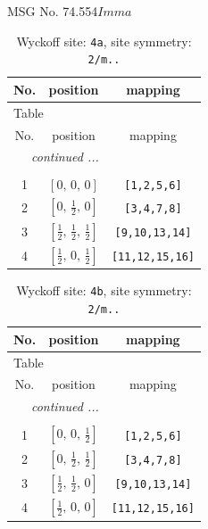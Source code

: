 \documentclass[fleqn,8pt]{jsarticle}
\begin{document}
\setcounter{MaxMatrixCols}{32}

\renewcommand{\tablename}{Table~}
\renewcommand{\figurename}{Figure~}
\begin{center}
\LARGE
MSG No. 74.554\quad$Imma$
\end{center}
\renewcommand{\arraystretch}{1.2}
\begin{longtable}{ccc}
\caption{Wyckoff site: {\tt 4a}, site symmetry: {\tt 2/m..}}
 \\
 \hline \hline
No. & position & mapping \\ \hline \endfirsthead

\multicolumn{2}{l}{\tablename\ \thetable{}} \\
 \hline \hline
No. & position & mapping \\ \hline \endhead

 \hline \hline
\multicolumn{2}{r}{\footnotesize\it continued ...} \\ \endfoot

 \hline \hline
\multicolumn{2}{r}{} \\ \endlastfoot

1 & $\left[ 0,\, 0,\, 0 \right]$ & {\tt [1,2,5,6]} \\ \hline
2 & $\left[ 0,\, \frac{1}{2},\, 0 \right]$ & {\tt [3,4,7,8]} \\ \hline
3 & $\left[ \frac{1}{2},\, \frac{1}{2},\, \frac{1}{2} \right]$ & {\tt [9,10,13,14]} \\ \hline
4 & $\left[ \frac{1}{2},\, 0,\, \frac{1}{2} \right]$ & {\tt [11,12,15,16]} \\
\end{longtable}
\renewcommand{\arraystretch}{1.2}
\begin{longtable}{ccc}
\caption{Wyckoff site: {\tt 4b}, site symmetry: {\tt 2/m..}}
 \\
 \hline \hline
No. & position & mapping \\ \hline \endfirsthead

\multicolumn{2}{l}{\tablename\ \thetable{}} \\
 \hline \hline
No. & position & mapping \\ \hline \endhead

 \hline \hline
\multicolumn{2}{r}{\footnotesize\it continued ...} \\ \endfoot

 \hline \hline
\multicolumn{2}{r}{} \\ \endlastfoot

1 & $\left[ 0,\, 0,\, \frac{1}{2} \right]$ & {\tt [1,2,5,6]} \\ \hline
2 & $\left[ 0,\, \frac{1}{2},\, \frac{1}{2} \right]$ & {\tt [3,4,7,8]} \\ \hline
3 & $\left[ \frac{1}{2},\, \frac{1}{2},\, 0 \right]$ & {\tt [9,10,13,14]} \\ \hline
4 & $\left[ \frac{1}{2},\, 0,\, 0 \right]$ & {\tt [11,12,15,16]} \\
\end{longtable}
\end{document}
